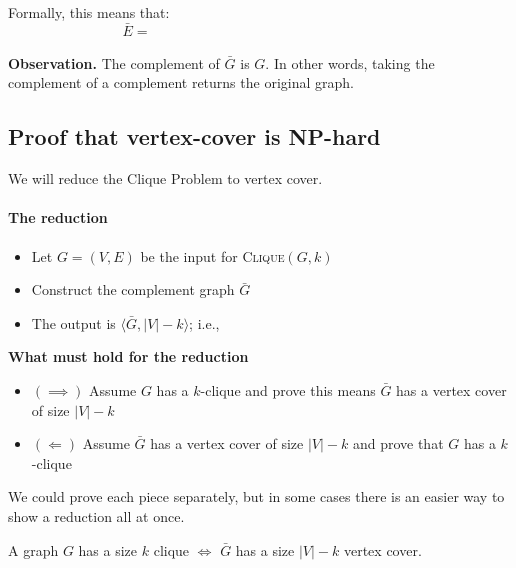 \documentclass[11  pt]{article}
\begin{document}
\vs{1cm} 

Formally, this means that:
\begin{equation*}
	\bar{E} = \phantom{\{(i,j) \in V \times V \colon i\neq j \text{ and } (i,j) \notin E)\}}
\end{equation*}



\vfill
\textbf{Observation.} The complement of $\bar{G}$ is $G$. In other words, taking the complement of a complement returns the original graph.
\newpage

\subsection*{Proof that vertex-cover is NP-hard}


We will reduce the Clique Problem to vertex cover. 

\paragraph{The reduction}

\begin{itemize}
	\item Let $G = (V,E)$ be the input for \textsc{Clique}$(G,k)$
	
	\item Construct the complement graph $\bar{G}$
	
	
	\item The output is $\langle \bar{G}, |V|-k \rangle$; i.e., \\%
	
\end{itemize}

\vs{.5cm}

\textbf{What must hold for the reduction}
\begin{itemize}
	\item $(\implies)$ Assume $G$ has a $k$-clique and prove this means $\bar{G}$ has a vertex cover of size $|V| - k$
	\item $(\Longleftarrow)$ Assume $\bar{G}$ has a vertex cover of size $|V| - k$ and prove that $G$ has a $k$-clique
\end{itemize}

We could prove each piece separately, but in some cases there is an easier way to show a reduction all at once.
\begin{theorem}
	A graph $G$ has a size $k$ clique $\iff$ $\bar{G}$ has a size $|V| - k$ vertex cover.
\end{theorem}
\end{document}
